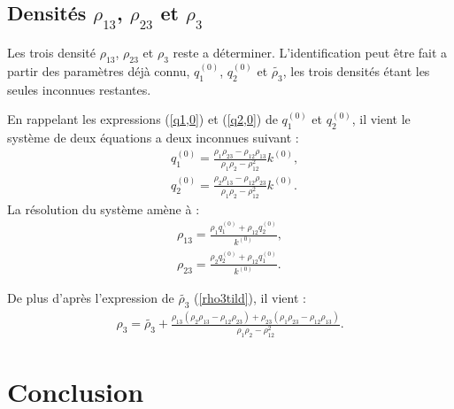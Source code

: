 \documentclass[12pt]{report}
\begin{document}
\subsection{Densités $\rho_{13}$, $\rho_{23}$ et $\rho_3$}
\label{Ch_Inv_S_rho_SS_rho13/23/3}
    Les trois densité $\rho_{13}$, $\rho_{23}$ et $\rho_3$ reste a déterminer. L'identification peut être fait a partir des paramètres déjà connu, $q_1^{(0)}$, $q_2^{(0)}$ et $\tilde{\rho_3}$, les trois densités étant les seules inconnues restantes.
    
    En rappelant les expressions (\ref{q1,0}) et (\ref{q2,0}) de $q_1^{(0)}$ et $q_2^{(0)}$, il vient le système de deux équations a deux inconnues suivant :
    \begin{align*}
    &q_1^{(0)}=\frac{\rho_1\rho_{23}-\rho_{12}\rho_{13}}{\rho_1\rho_2-\rho_{12}^2}k^{(0)},\\
    &q_2^{(0)}=\frac{\rho_2\rho_{13}-\rho_{12}\rho_{23}}{\rho_1\rho_2-\rho_{12}^2}k^{(0)}.
    \end{align*}
    La résolution du système amène à :
    \begin{align*}
    \rho_{13}=\frac{\rho_1q_1^{(0)}+\rho_{12}q_2^{(0)}}{k^{(0)}},\\
    \rho_{23}=\frac{\rho_2q_2^{(0)}+\rho_{12}q_1^{(0)}}{k^{(0)}}.
    \end{align*}

    De plus d'après l'expression de $\tilde{\rho_3}$ (\ref{rho3tild}), il vient :
    \begin{align}
    \rho_3=\tilde{\rho_3}+\frac{\rho_{13}(\rho_2\rho_{13}-\rho_{12}\rho_{23})+\rho_{23}(\rho_1\rho_{23}-\rho_{12}\rho_{13})}{\rho_1\rho_2-\rho_{12}^2}.
    \end{align}
    
\section{Conclusion}
\label{Ch_Inv_S_Conc}
    
\end{document}
